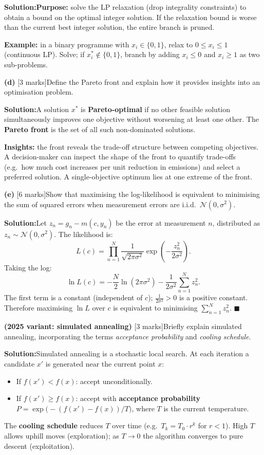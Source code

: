 \documentclass[10pt,a4paper]{article}
\newcommand{\Sol}{\par\vspace{4pt}\noindent\textbf{Solution:}\enspace}
\begin{document}
\Sol \textbf{Purpose:} solve the LP relaxation (drop integrality constraints)
to obtain a bound on the optimal integer solution. If the relaxation bound is
worse than the current best integer solution, the entire branch is pruned.

\textbf{Example:} in a binary programme with $x_i\in\{0,1\}$, relax to
$0\leq x_i\leq1$ (continuous LP). Solve; if $x_i^*\notin\{0,1\}$, branch
by adding $x_i\leq0$ and $x_i\geq1$ as two sub-problems.

\vspace{4pt}
\noindent\textbf{(d)} [3 marks]\quad Define the Pareto front and explain how it
provides insights into an optimisation problem.

\Sol A solution $x^*$ is \textbf{Pareto-optimal} if no other feasible solution
simultaneously improves one objective without worsening at least one other. The
\textbf{Pareto front} is the set of all such non-dominated solutions.

\textbf{Insights:} the front reveals the trade-off structure between competing
objectives. A decision-maker can inspect the shape of the front to quantify
trade-offs (e.g.\ how much cost increases per unit reduction in emissions) and
select a preferred solution. A single-objective optimum lies at one extreme of
the front.

\vspace{4pt}
\noindent\textbf{(e)} [6 marks]\quad Show that maximising the log-likelihood is
equivalent to minimising the sum of squared errors when measurement errors are
i.i.d.\ $\mathcal{N}(0,\sigma^2)$.

\Sol Let $z_n = g_n - m(c,y_n)$ be the error at measurement $n$, distributed as
$z_n\sim\mathcal{N}(0,\sigma^2)$. The likelihood is:
\[
  L(c) = \prod_{n=1}^{N} \frac{1}{\sqrt{2\pi\sigma^2}}
         \exp\!\left(-\frac{z_n^2}{2\sigma^2}\right).
\]
Taking the log:
\[
  \ln L(c) = -\frac{N}{2}\ln(2\pi\sigma^2)
             - \frac{1}{2\sigma^2}\sum_{n=1}^{N} z_n^2.
\]
The first term is a constant (independent of $c$); $\frac{1}{2\sigma^2}>0$ is a
positive constant. Therefore maximising $\ln L$ over $c$ is equivalent to
minimising $\sum_{n=1}^N z_n^2$. $\blacksquare$

\vspace{4pt}
\noindent\textbf{(2025 variant: simulated annealing)} [3 marks]\quad Briefly
explain simulated annealing, incorporating the terms \textit{acceptance
probability} and \textit{cooling schedule}.

\Sol Simulated annealing is a stochastic local search. At each iteration a
candidate $x'$ is generated near the current point $x$:
\begin{itemize}[noitemsep, topsep=2pt]
  \item If $f(x') < f(x)$: accept unconditionally.
  \item If $f(x') \geq f(x)$: accept with \textbf{acceptance probability}
        $P = \exp\!\bigl(-(f(x')-f(x))/T\bigr)$, where $T$ is the current
        temperature.
\end{itemize}
The \textbf{cooling schedule} reduces $T$ over time (e.g.\ $T_k = T_0\cdot r^k$
for $r<1$). High $T$ allows uphill moves (exploration); as $T\to0$ the algorithm
converges to pure descent (exploitation).
\end{document}
